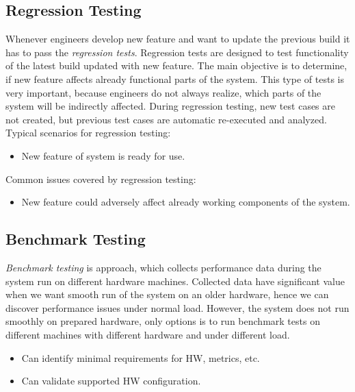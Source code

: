\subsection*{Regression Testing}
Whenever engineers develop new feature and want to update the previous build it has to pass the \emph{regression tests}\footnotemark \cite{STF:REGRESSION}. Regression tests are designed to test functionality of the latest build updated with new feature. The main objective is to determine, if new feature affects already functional parts of the system. This type of tests is very important, because engineers do not always realize, which parts of the system will be indirectly affected. During regression testing, new test cases are not created, but previous test cases are automatic re-executed and analyzed. 
Typical scenarios for regression testing:
\begin{itemize}
	\setlength\itemsep{0em}
	\item New feature of system is ready for use.
\end{itemize}
Common issues covered by regression testing:
\begin{itemize}
	\setlength\itemsep{0em}
	\item New feature could adversely affect already working components of the system.
\end{itemize}


\subsection*{Benchmark Testing}
\emph{Benchmark testing}\footnotemark \cite{Aho:Benchmarking} is approach, which collects performance data during the system run on different hardware machines. Collected data have significant value when we want smooth run of the system on an older hardware, hence we can discover performance issues under normal load. However, the system does not run smoothly on prepared hardware, only options is to run benchmark tests on different machines with different hardware and under different load.

\begin{itemize}
	\item Can identify minimal requirements for HW, metrics, etc.
	\item Can validate supported HW configuration.
\end{itemize}

